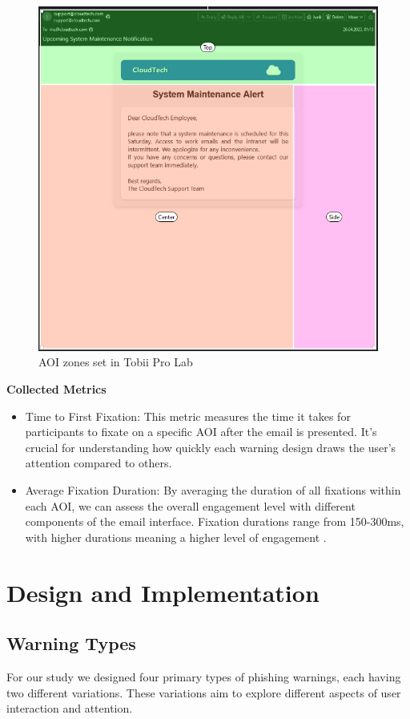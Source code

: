 \documentclass[
  a4paper,  %
  twoside,  %
  bibliography=totoc,
  headsepline,
  cleardoublepage=empty,
  parskip=half,
  draft=false
]{scrbook}
\begin{document}
\begin{figure} [ht]
    \centering
    \includegraphics[width=0.8\linewidth]{figures/aoi.png}
    \caption{AOI zones set in Tobii Pro Lab}
    \label{fig:aoi}
\end{figure}
\newpage
\textbf{Collected Metrics}

\begin{itemize}
    \item Time to First Fixation: This metric measures the time it takes for participants to fixate on a specific AOI after the email is presented. It's crucial for understanding how quickly each warning design draws the user's attention compared to others.
    \item Average Fixation Duration: By averaging the duration of all fixations within each AOI, we can assess the overall engagement level with different components of the email interface. Fixation durations range from 150-300ms, with higher durations meaning a higher level of engagement \cite{eyetrack}.
\end{itemize}

\chapter{Design and Implementation}
\label{implementation}

\section{Warning Types}
\label{types}
For our study we designed four primary types of phishing warnings, each having two different variations. These variations aim to explore different aspects of user interaction and attention.
\end{document}
